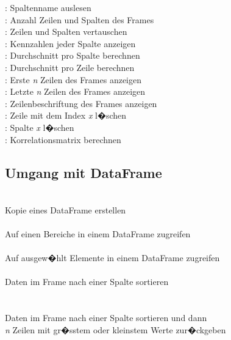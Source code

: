 \documentclass{article}
\begin{document}
\begin{multicols*}{3}
: Spaltenname auslesen \\ 
: Anzahl Zeilen und Spalten des Frames \\
: Zeilen und Spalten vertauschen \\ 
: Kennzahlen jeder Spalte anzeigen \\
: Durchschnitt pro Spalte berechnen \\ 
: Durchschnitt pro Zeile berechnen \\
: Erste \textit{n} Zeilen des Frames anzeigen \\
: Letzte \textit{n} Zeilen des Frames anzeigen \\
: Zeilenbeschriftung des Frames anzeigen \\
: Zeile mit dem Index \textit{x} l�schen \\
: Spalte \textit{x} l�schen \\
: Korrelationsmatrix berechnen

\subsection*{Umgang mit DataFrame}
 \\
Kopie eines DataFrame erstellen \\

 \\
Auf einen Bereiche in einem DataFrame zugreifen \\

 \\
Auf ausgew�hlt Elemente in einem DataFrame zugreifen \\

 \\
Daten im Frame nach einer Spalte sortieren \\

 \\
 \\
Daten im Frame nach einer Spalte sortieren und dann \\ 
\textit{n} Zeilen mit gr�sstem oder kleinstem Werte zur�ckgeben \\


\end{multicols*}
\end{document}
